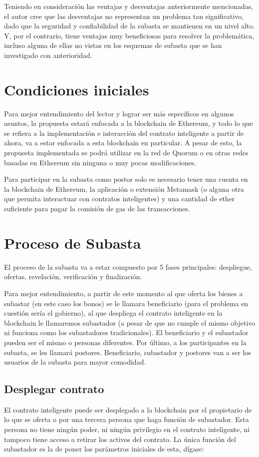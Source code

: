     Teniendo en consideración las ventajas y desventajas anteriormente mencionadas, el autor cree que las desventajas no representan un
    problema tan significativo, dado que la seguridad y confiabilidad de la subasta se mantienen en un nivel alto. Y, por el contrario, tiene
    ventajas muy beneficiosas para resolver la problemática, incluso alguna de ellas no vistas en los esquemas de subasta que se han 
    investigado con anterioridad.

    \section{Condiciones iniciales}
    Para mejor entendimiento del lector y lograr ser más específicos en algunos asuntos, la propuesta estará enfocada a la blockchain de
    Ethereum, y todo lo que se refiera a la implementación e interacción del contrato inteligente a partir de ahora, va a estar enfocada
    a esta blockchain en particular. A pesar de esto, la propuesta implementada se podrá utilizar en la red de Quorum o en otras redes basadas
    en Ethereum sin ninguna o muy pocas modificaciones.

    Para participar en la subasta como postor solo es necesario tener una cuenta en la blockchain de Ethereum, la aplicación o extensión
    Metamask (o alguna otra que permita interactuar con contratos inteligentes) y una cantidad de ether suficiente para pagar la comisión
    de gas de las transacciones.

    \section{Proceso de Subasta}
    El proceso de la subasta va a estar compuesto por 5 fases principales: despliegue, ofertas, revelación,
    verificación y finalización.

    Para mejor entendimiento, a partir de este momento al que oferta los bienes a subastar (en este caso los bonos) se le llamara 
    beneficiario (para el problema en cuestión sería el gobierno), al que despliega el contrato inteligente en la blockchain le llamaremos 
    subastador (a pesar de que no cumple el mismo objetivo ni funciona como los subastadores tradicionales). El beneficiario y el 
    subastador pueden ser el mismo o personas diferentes. Por último, a los participantes en la subasta, se les llamará postores. 
    Beneficiario, subastador y postores van a ser los usuarios de la subasta para mayor comodidad.

    \subsection{Desplegar contrato}
      El contrato inteligente puede ser desplegado a la blockchain por el propietario de lo que se oferta
      o por una tercera persona que haga función de subastador. Esta persona no tiene ningún poder, ni ningún
      privilegio en el contrato inteligente, ni tampoco tiene acceso a retirar los activos del contrato. La única función del subastador 
      es la de poner los parámetros iniciales de esta, dígase: 
    
